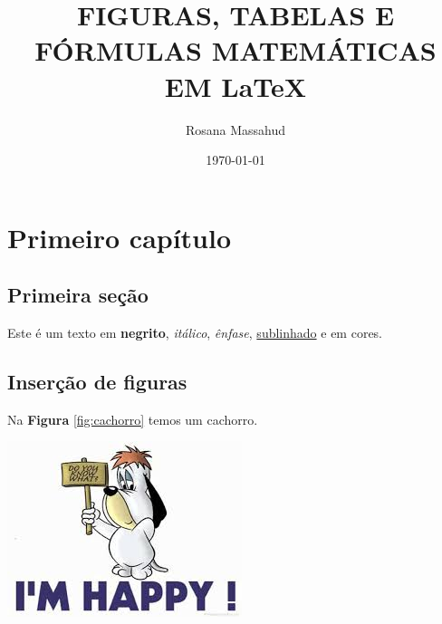 \documentclass[12pt,a4paper,oneside,titlepage]{report}
\title{FIGURAS, TABELAS E FÓRMULAS MATEMÁTICAS EM \LaTeX}
\author{Rosana Massahud}
\date{\today}
\begin{document}
\clearpage\maketitle
\listoffigures
\listoftables
\tableofcontents



\chapter{Primeiro capítulo}
\section{Primeira seção}

Este é um texto em \textbf{negrito}, \textit{itálico}, \emph{ênfase}, \underline{sublinhado} e em cores.

\lipsum[1-2]
\color{airforceblue}\lipsum[1-2]
\color{red}\lipsum[1-1]
\color{black}


\section{Inserção de figuras}
\begin{flushleft}
\lipsum[1-2]
\end{flushleft}

Na \textbf{Figura} \ref{fig:cachorro} temos um cachorro.

\includegraphics[scale=0.5]{figuras/droopy.jpg}
\end{document}

